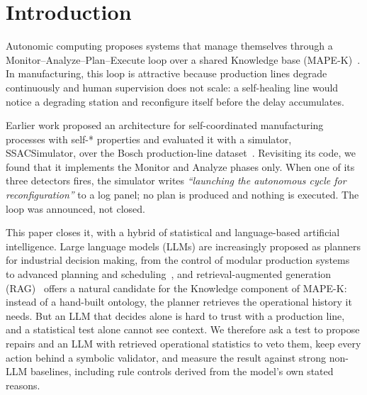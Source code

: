 \documentclass[preprint,11pt]{elsarticle}
\begin{document}
\section{Introduction}
\label{sec:intro}

Autonomic computing proposes systems that manage themselves through a Monitor--Analyze--Plan--Execute loop over a shared Knowledge base (MAPE-K)~\cite{kephart2003vision,weyns2020introduction}. In manufacturing, this loop is attractive because production lines degrade continuously and human supervision does not scale: a self-healing line would notice a degrading station and reconfigure itself before the delay accumulates.

Earlier work proposed an architecture for self-coordinated manufacturing processes with self-* properties and evaluated it with a simulator, SSACSimulator, over the Bosch production-line dataset~\cite{sanchez2020selfstar,sanchez2020jii}. Revisiting its code, we found that it implements the Monitor and Analyze phases only. When one of its three detectors fires, the simulator writes \emph{``launching the autonomous cycle for reconfiguration''} to a log panel; no plan is produced and nothing is executed. The loop was announced, not closed.

This paper closes it, with a hybrid of statistical and language-based artificial intelligence. Large language models (LLMs) are increasingly proposed as planners for industrial decision making, from the control of modular production systems~\cite{xia2023towards} to advanced planning and scheduling~\cite{li2026a4ps}, and retrieval-augmented generation (RAG)~\cite{lewis2020rag} offers a natural candidate for the Knowledge component of MAPE-K: instead of a hand-built ontology, the planner retrieves the operational history it needs. But an LLM that decides alone is hard to trust with a production line, and a statistical test alone cannot see context. We therefore ask a test to propose repairs and an LLM with retrieved operational statistics to veto them, keep every action behind a symbolic validator, and measure the result against strong non-LLM baselines, including rule controls derived from the model's own stated reasons.
\end{document}
